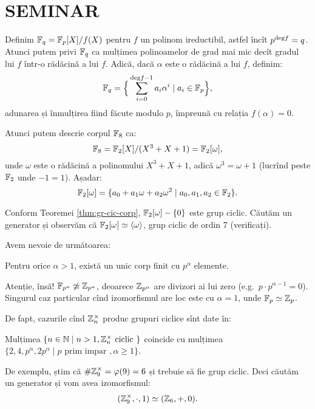 
\section{SEMINAR}

Definim $ \mathbb{F}_q = \mathbb{F}_p[X]/f(X) $ pentru $ f $ un polinom ireductibil, astfel încît
$ p^{\mathrm{deg}f} = q $. Atunci putem privi $ \mathbb{F}_q $ ca mulțimea polinoamelor
de grad mai mic decît gradul lui $ f $ într-o rădăcină a lui $ f $. Adică, dacă
$ \alpha $ este o rădăcină a lui $ f $, definim:
\[
  \mathbb{F}_q = \Big\{ \sum_{i=0}^{\mathrm{deg}f - 1} a_i \alpha^i \mid a_i \in \mathbb{F}_p \Big\},
\]
adunarea și înmulțirea fiind făcute modulo $ p $, împreună cu relația $ f(\alpha) = 0 $.

Atunci putem descrie corpul $ \mathbb{F}_8 $ ca:
\[
  \mathbb{F}_8 = \mathbb{F}_2[X]/(X^3 + X + 1) = \mathbb{F}_2[\omega],
\]
unde $ \omega $ este o rădăcină a polinomului $ X^3 + X + 1 $, adică
$ \omega^3 = \omega + 1 $ (lucrînd peste $ \mathbb{F}_2 $ unde $ -1 = 1 $).
Așadar:
\[
  \mathbb{F}_2[\omega] = \{ a_0 + a_1 \omega + a_2 \omega^2 \mid a_0, a_1, a_2 \in \mathbb{F}_2 \}.
\]

Conform Teoremei \ref{thm:gr-cic-corp}, $ \mathbb{F}_2[\omega] - \{ 0 \} $ este grup ciclic.
Căutăm un generator și observăm că $ \mathbb{F}_2[\omega] \simeq \langle \omega \rangle $,
grup ciclic de ordin 7 (verificați).

Avem nevoie de următoarea:

\begin{theorem}\label{thm:corp-p-alpha}
  Pentru orice $ \alpha > 1 $, există un unic corp finit cu $ p^\alpha $ elemente.
\end{theorem}

Atenție, însă! $ \mathbb{F}_{p^\alpha} \not\simeq \mathbb{Z}_{p^\alpha} $, deoarece
$ \mathbb{Z}_{p^\alpha} $ are divizori ai lui zero (e.g.\ $ p \cdot p^{\alpha - 1} = 0 $).
Singurul caz particular cînd izomorfismul are loc este cu $ \alpha = 1 $, unde
$ \mathbb{F}_p \simeq \mathbb{Z}_p $.

De fapt, cazurile cînd $ \mathbb{Z}_n^\times $ produc grupuri ciclice sînt date în:

\begin{theorem}\label{thm:zp-ciclic}
  Mulțimea $ \{ n \in \mathbb{N} \mid n > 1, \mathbb{Z}_n^\times \text{ ciclic } \} $ coincide
  cu mulțimea $ \{ 2, 4, p^\alpha, 2p^\alpha \mid p \text{ prim impar }, \alpha \geq 1 \} $.
\end{theorem}

De exemplu, știm că $ \# \mathbb{Z}_9^\times = \varphi(9) = 6 $ și trebuie să
fie grup ciclic. Deci căutăm un generator și vom avea izomorfismul:
\[
  (\mathbb{Z}_9^\times, \cdot, 1) \simeq (\mathbb{Z}_6, +, 0).
\]

